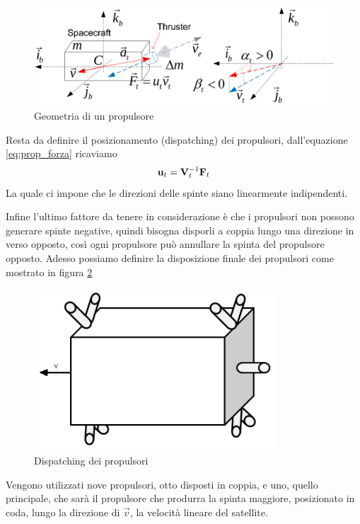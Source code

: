 \begin{figure}[htp]
\begin{center}
  \includegraphics[width=\textwidth]
  {modelling/attitude_kinematics_and_dynamics/image/geometria_del_propulsore.png}
  \caption{Geometria di un propulsore}
  \label{fig:geom_propulsore}
\end{center}
\end{figure}

Resta da definire il posizionamento (dispatching) dei propulsori, dall'equazione
\ref{eq:prop_forza} ricaviamo
\begin{equation}
{\bf u}_t={\bf V}_t^{-1}{\bf F}_t
\end{equation}
La quale ci impone che le direzioni delle spinte siano linearmente indipendenti.

Infine l'ultimo fattore da tenere in considerazione è che i propulsori non
possono generare spinte negative, quindi bisogna disporli a coppia lungo una
direzione in verso opposto, così ogni propulsore può annullare la spinta del
propulsore opposto. Adesso possiamo definire la disposizione finale dei
propulsori come mostrato in figura \ref{fig:dispatching}

\begin{figure}[htp]
\begin{center}
  \includegraphics[width=9cm]
  {modelling/attitude_kinematics_and_dynamics/image/dispatching.png}
  \caption{Dispatching dei propulsori}
  \label{fig:dispatching}
\end{center}
\end{figure}

Vengono utilizzati nove propulsori, otto disposti in coppia, e uno, quello
principale, che sarà il propulsore che produrra la spinta maggiore, posizionato
in coda, lungo la direzione di $\vec{v}$, la velocità lineare del satellite.